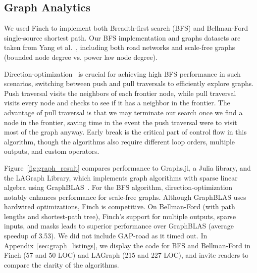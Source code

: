 \subsection{Graph Analytics}

We used Finch to implement both Breadth-first search (BFS) and Bellman-Ford single-source shortest path.
%
Our BFS implementation and graphs datasets are taken from Yang et al.~\cite{yang_implementing_2018}, including both road networks and scale-free graphs (bounded node degree vs. power law node degree).


Direction-optimization~\cite{beamer2012direction} is crucial for achieving high BFS performance in such scenarios, switching between push and pull traversals to efficiently explore graphs.
%
Push traversal visits the neighbors of each frontier node, while pull traversal visits every node and checks to see if it has a neighbor in the frontier. 
%
The advantage of pull traversal is that we may terminate our search once we find a node in the frontier, saving time in the event the push traversal were to visit most of the graph anyway. 
%
Early break is the critical part of control flow in this algorithm, though the algorithms also require different loop orders, multiple outputs, and custom operators.

Figure~\ref{fig:graph_result} compares performance to Graphs.jl, a Julia library, and the LAGraph Library, which implements graph algorithms with sparse linear algebra using GraphBLAS~\cite{mattson2019lagraph}.
%
For the BFS algorithm, direction-optimization notably enhances performance for scale-free graphs. 
%
Although GraphBLAS uses hardwired optimizations, Finch is competitive. 
%
On Bellman-Ford (with path lengths and shortest-path tree), Finch's support for multiple outputs, sparse inputs, and masks leads to superior performance over GraphBLAS (average speedup of 3.53). 
%
We did not include GAP-road as it timed out. %
%
In Appendix~\ref{sec:graph_listings}, we display the code for BFS and Bellman-Ford in Finch (57 and 50 LOC) and LAGraph (215 and 227 LOC), and invite readers to compare the clarity of the algorithms.
 
